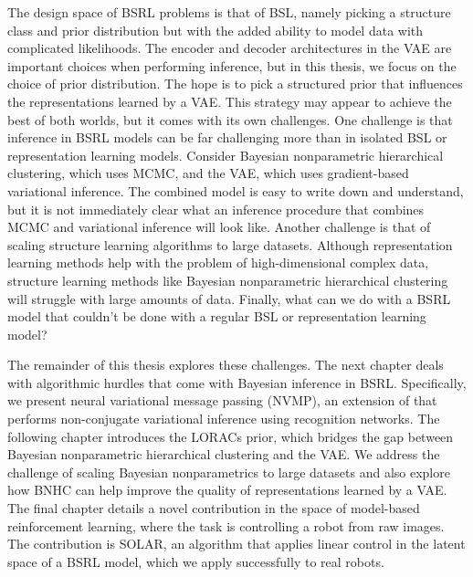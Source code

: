 The design space of BSRL problems
is that of BSL, namely
picking a structure class
and prior distribution
but with the added ability
to model data
with complicated likelihoods.
The encoder and decoder architectures
in the VAE are important
choices when performing inference,
but in this thesis, we focus on
the choice of prior distribution.
The hope is to pick a structured
prior that influences the representations
learned by a VAE.
This strategy may appear to
achieve the best of both worlds,
but it comes
with its own challenges.
One challenge is that inference in BSRL models
can be far challenging
more than in isolated BSL or representation
learning models. Consider Bayesian
nonparametric hierarchical clustering,
which uses MCMC, and the VAE,
which uses gradient-based variational
inference. The combined model
is easy to write down and understand,
but it is not immediately clear
what an inference procedure that combines
MCMC and variational inference
will look like. Another challenge 
is that of scaling structure learning
algorithms to large datasets. Although
representation learning methods help
with the problem of high-dimensional
complex data, structure learning methods
like Bayesian nonparametric hierarchical clustering
will struggle with large amounts of data.
Finally, what can we do with a BSRL model
that couldn't be done with a regular BSL or representation
learning model?

The remainder of this thesis
explores these challenges.
The next chapter deals with algorithmic
hurdles that come with Bayesian
inference in BSRL. Specifically,
we present neural variational message
passing (NVMP), an extension of \citet{Johnson2016}
that performs non-conjugate variational inference 
using recognition networks.
The following chapter introduces
the LORACs prior, which
bridges the gap between
Bayesian nonparametric
hierarchical clustering and the VAE.
We address the challenge of scaling
Bayesian nonparametrics to large datasets
and also explore how BNHC can help improve
the quality of representations learned
by a VAE.
The final chapter details a novel
contribution in the space
of model-based reinforcement learning, where
the task is controlling a robot from raw images.
The contribution is SOLAR, an algorithm
that applies linear control
in the latent space of a BSRL model,
which we apply successfully to real robots.
